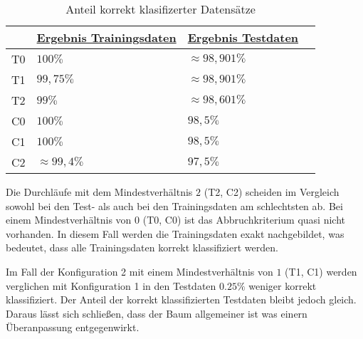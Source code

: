 \useunder{\uline}{\ul}{}
\begin{table}[h]
    \begin{center}
        \begin{tabular}{|l|l|l|l|}
        \hline
                                & {\ul \textbf{Ergebnis Trainingsdaten}} & {\ul \textbf{Ergebnis Testdaten}} \\
            \hline
            T0                  & $100\%$                                & $\approx 98,901\%$                  \\
            \hline
            T1                  & $99,75\%$                              & $\approx 98,901\%$                  \\
            \hline
            T2                  & $99\%$                                 & $\approx 98,601\%$                  \\
            \hline
            \hline
            C0                  & $100\%$                                & $98,5\%$                  \\
            \hline
            C1                  & $100\%$                                & $98,5\%$                  \\
            \hline
            C2                  & $\approx 99,4\%$                       & $97,5\%$                  \\
            \hline
        \end{tabular}
        \caption{Anteil korrekt klasifizerter Datensätze}
        \label{tab:run-results}
    \end{center}
\end{table}


Die Durchläufe mit dem Mindestverhältnis $2$ (T2, C2) scheiden im Vergleich sowohl bei den Test- als auch bei den Trainingsdaten am schlechtsten ab.
Bei einem Mindestverhältnis von $0$ (T0, C0) ist das Abbruchkriterium quasi nicht vorhanden.
In diesem Fall werden die Trainingsdaten exakt nachgebildet,
was bedeutet, dass alle Trainingsdaten korrekt klassifiziert werden.

Im Fall der Konfiguration 2 mit einem Mindestverhältnis von $1$ (T1, C1) werden verglichen mit Konfiguration 1 in den Testdaten $0.25\%$ weniger korrekt klassifiziert.
Der Anteil der korrekt klassifizierten Testdaten bleibt jedoch gleich.
Daraus lässt sich schließen,
dass der Baum allgemeiner ist was einern Überanpassung entgegenwirkt.

